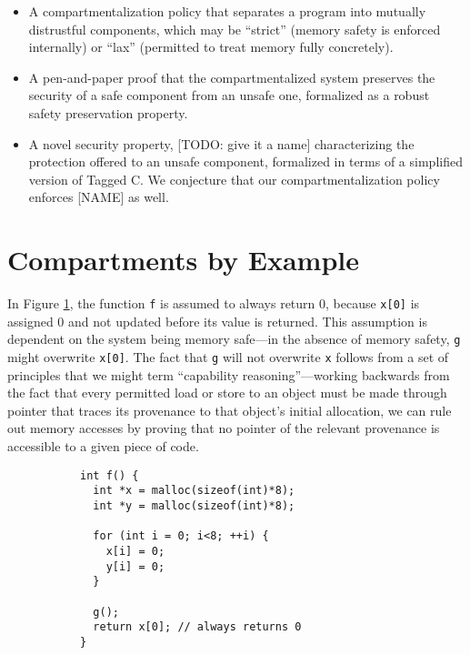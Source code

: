 \documentclass{article}
\begin{document}
\begin{itemize}
\item A compartmentalization policy that separates a program into mutually distrustful
  components, which may be ``strict'' (memory safety is enforced internally) or ``lax''
  (permitted to treat memory fully concretely).
\item A pen-and-paper proof that the compartmentalized system preserves the security of a
  safe component from an unsafe one, formalized as a robust safety preservation property.
\item A novel security property, [TODO: give it a name] characterizing the protection offered
  to an unsafe component, formalized in terms of a simplified version of Tagged C. We conjecture
  that our compartmentalization policy enforces [NAME] as well.
\end{itemize}

\section{Compartments by Example}

In Figure \ref{fig:basic}, the function {\tt f} is assumed to always return 0,
because {\tt x[0]} is assigned 0 and not updated before its value is returned. This assumption
is dependent on the system being memory safe---in the absence of memory safety, {\tt g} might
overwrite {\tt x[0]}. The fact that {\tt g} will not overwrite {\tt x} follows from a set of
principles that we might term ``capability reasoning''---working backwards from the fact
that every permitted load or store to an object must be made through pointer that traces
its provenance to that object's initial allocation, we can rule out memory accesses by
proving that no pointer of the relevant provenance is accessible to a given piece of code.

\begin{figure}
  \begin{subfigure}{0.5\textwidth}
\begin{verbatim}
int f() {
  int *x = malloc(sizeof(int)*8);
  int *y = malloc(sizeof(int)*8);

  for (int i = 0; i<8; ++i) {
    x[i] = 0;
    y[i] = 0;
  }

  g();
  return x[0]; // always returns 0
}
\end{verbatim}
  \end{subfigure}
  
\caption{}
\label{fig:basic}
\end{figure}
\end{document}
